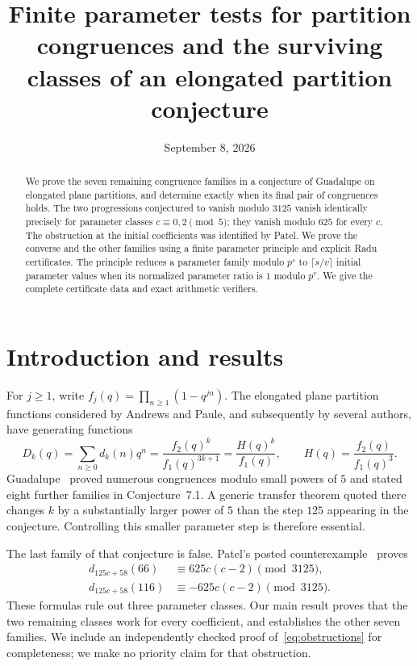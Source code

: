 \documentclass[11pt]{article}
\title{Finite parameter tests for partition congruences and the surviving classes of an elongated partition conjecture}
\author{}
\date{September 8, 2026}
\begin{document}
\maketitle
\begin{abstract}
We prove the seven remaining congruence families in a conjecture of Guadalupe on elongated plane partitions, and determine exactly when its final pair of congruences holds. The two progressions conjectured to vanish modulo $3125$ vanish identically precisely for parameter classes $c\equiv0,2\pmod5$; they vanish modulo $625$ for every $c$. The obstruction at the initial coefficients was identified by Patel. We prove the converse and the other families using a finite parameter principle and explicit Radu certificates. The principle reduces a parameter family modulo $p^s$ to $\lceil s/v\rceil$ initial parameter values when its normalized parameter ratio is $1$ modulo $p^v$. We give the complete certificate data and exact arithmetic verifiers.
\end{abstract}

\section{Introduction and results}
For $j\ge1$, write $f_j(q)=\prod_{n\ge1}(1-q^{jn})$. The elongated plane partition functions considered by Andrews and Paule, and subsequently by several authors, have generating functions
\begin{equation}\label{eq:gf}
D_k(q)=\sum_{n\ge0}d_k(n)q^n=\frac{f_2(q)^k}{f_1(q)^{3k+1}}
=\frac{H(q)^k}{f_1(q)},\qquad H(q)=\frac{f_2(q)}{f_1(q)^3}.
\end{equation}
Guadalupe~\cite{Guadalupe} proved numerous congruences modulo small powers of $5$ and stated eight further families in Conjecture~7.1. A generic transfer theorem quoted there changes $k$ by a substantially larger power of $5$ than the step $125$ appearing in the conjecture. Controlling this smaller parameter step is therefore essential.

The last family of that conjecture is false. Patel's posted counterexample~\cite{Patel} proves
\begin{equation}\label{eq:obstructions}
\begin{split}
d_{125c+58}(66)&\equiv625c(c-2)\pmod{3125},\\
d_{125c+58}(116)&\equiv-625c(c-2)\pmod{3125}.
\end{split}
\end{equation}
These formulas rule out three parameter classes. Our main result proves that the two remaining classes work for every coefficient, and establishes the other seven families. We include an independently checked proof of~\eqref{eq:obstructions} for completeness; we make no priority claim for that obstruction.
\end{document}
